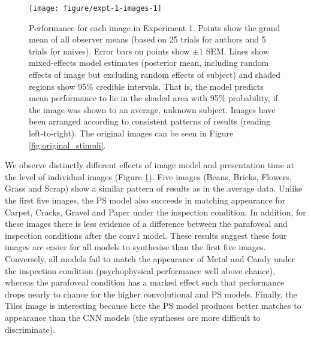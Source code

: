 \documentclass[article, 11pt,a4paper,natbib]{apa6}\usepackage[]{graphicx}\usepackage[]{color}
\newenvironment{knitrout}{}{} %
\begin{document}


\begin{knitrout}
\color{fgcolor}\begin{figure}
\texttt{[image: figure/expt-1-images-1]} \caption{Performance for each image in Experiment 1. 
              Points show the grand mean of all observer means (based on 25 trials for authors and 5 trials for naives). 
              Error bars on points show $\pm 1$ SEM. 
              Lines show mixed-effects model estimates (posterior mean, including random effects of image but excluding random effects of subject) and shaded regions show 95\% credible intervals.
              That is, the model predicts mean performance to lie in the shaded area with 95\% probability, if the image was shown to an average, unknown subject.
              Images have been arranged according to consistent patterns of results (reading left-to-right).
              The original images can be seen in Figure \ref{fig:original_stimuli}.}\label{fig:expt-1-images}
\end{figure}


\end{knitrout}

We observe distinctly different effects of image model and presentation time at the level of individual images (Figure \ref{fig:expt-1-images}).
Five images (Beans, Bricks, Flowers, Grass and Scrap) show a similar pattern of results as in the average data.
Unlike the first five images, the PS model also succeeds in matching appearance for Carpet, Cracks, Gravel and Paper under the inspection condition. 
In addition, for these images there is less evidence of a difference between the parafoveal and inspection conditions after the conv1 model. 
These results suggest these four images are easier for all models to synthesise than the first five images.
Conversely, all models fail to match the appearance of Metal and Candy under the inspection condition (psychophysical performance well above chance), whereas the parafoveal condition has a marked effect such that performance drops nearly to chance for the higher convolutional and PS models.
Finally, the Tiles image is interesting because here the PS model produces better matches to appearance than the CNN models (the syntheses are more difficult to discriminate).
\end{document}
